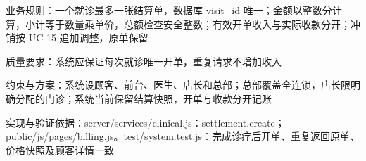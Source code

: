 \documentclass[UTF8,12pt,a4paper,fontset=none]{ctexart}
\begin{document}
业务规则：一个就诊最多一张结算单，数据库 visit\_\allowbreak{}id 唯一；金额以整数分计算，小计等于数量乘单价，总额检查安全整数；有效开单收入与实际收款分开；冲销按 UC-15 追加调整，原单保留\par
质量要求：系统应保证每次就诊唯一开单，重复请求不增加收入\par
约束与方案：系统设顾客、前台、医生、店长和总部；总部覆盖全连锁，店长限明确分配的门诊；系统当前保留结算快照，开单与收款分开记账\par
实现与验证依据：server/\allowbreak{}services/\allowbreak{}clinical.\allowbreak{}js：settlement.\allowbreak{}create；public/\allowbreak{}js/\allowbreak{}pages/\allowbreak{}billing.\allowbreak{}js。test/\allowbreak{}system.\allowbreak{}test.\allowbreak{}js：完成诊疗后开单、重复返回原单、价格快照及顾客详情一致\par
{}
\end{document}
